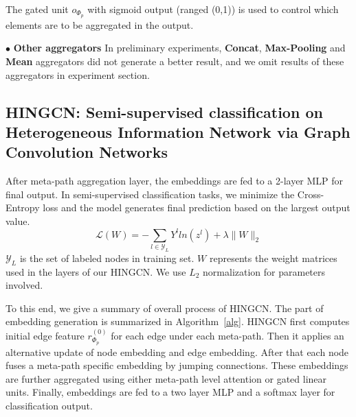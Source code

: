 The gated unit $o_{\Phi_p}$ with sigmoid output (ranged (0,1)) is used to control which elements are to be aggregated in the output. 
 
$\bullet$ \textbf{Other aggregators}
In preliminary experiments, \textbf{Concat}, \textbf{Max-Pooling} and \textbf{Mean} aggregators did not generate a better result, and we omit results of these aggregators in experiment section.

\subsection{HINGCN: Semi-supervised classification on Heterogeneous Information Network via Graph Convolution Networks}
After meta-path aggregation layer, the embeddings are fed to a 2-layer MLP for final output. In semi-supervised classification tasks, we minimize the Cross-Entropy loss and the model generates final prediction based on the largest output value.
\begin{equation}
\label{eq:loss}
\mathcal{L}(W)=   - \sum_{l\in \mathcal{Y}_L}Y^l ln(z^l)   + \lambda \parallel W \parallel_2
\end{equation}
$ \mathcal{Y}_L$ is the set of labeled nodes in training set. $W$ represents the weight matrices used in the layers of our HINGCN. We use $L_2$ normalization for parameters involved.

To this end, we give a summary of overall process of HINGCN.
The part of embedding generation is summarized in Algorithm~\ref{alg}.
HINGCN first computes initial edge feature $r^{(0)}_{\Phi_p}$ for each edge under each meta-path. Then it applies an alternative update of node embedding and edge embedding.
After that each node fuses a meta-path specific embedding by jumping connections. These embeddings are further aggregated using either meta-path level attention or gated linear units. Finally, embeddings are fed to a two layer MLP and a softmax layer for classification output.

